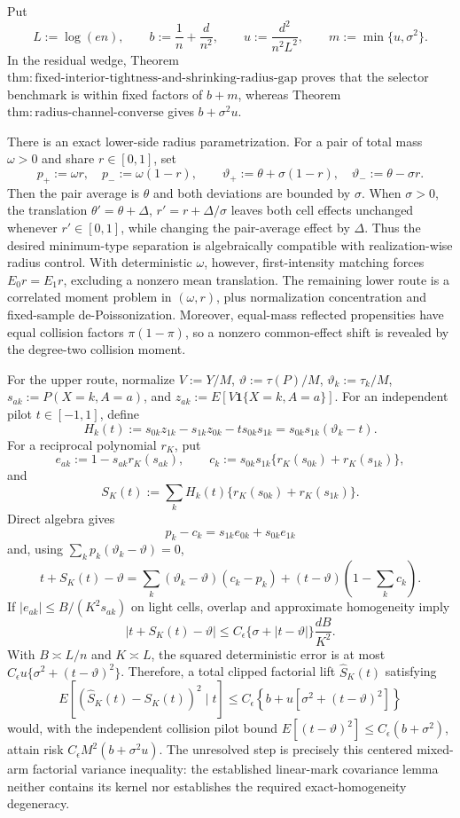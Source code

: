 Put
\[
 L:=\log(en),\qquad b:=\frac1n+\frac d{n^2},\qquad
 u:=\frac{d^2}{n^2L^2},\qquad m:=\min\{u,\sigma^2\}.
\]
In the residual wedge, Theorem~\(\mathrm{thm:fixed\text{-}interior\text{-}tightness\text{-}and\text{-}shrinking\text{-}radius\text{-}gap}\) proves that the selector benchmark is within fixed factors of \(b+m\), whereas Theorem~\(\mathrm{thm:radius\text{-}channel\text{-}converse}\) gives \(b+\sigma^2u\).

There is an exact lower-side radius parametrization.  For a pair of total mass \(\omega>0\) and share \(r\in[0,1]\), set
\[
 p_+:=\omega r,\quad p_-:=\omega(1-r),\qquad
 \vartheta_+:=\theta+\sigma(1-r),\quad
 \vartheta_-:=\theta-\sigma r.
\]
Then the pair average is \(\theta\) and both deviations are bounded by \(\sigma\).  When \(\sigma>0\), the translation \(\theta'=\theta+\Delta\), \(r'=r+\Delta/\sigma\) leaves both cell effects unchanged whenever \(r'\in[0,1]\), while changing the pair-average effect by \(\Delta\).  Thus the desired minimum-type separation is algebraically compatible with realization-wise radius control.  With deterministic \(\omega\), however, first-intensity matching forces \(E_0r=E_1r\), excluding a nonzero mean translation.  The remaining lower route is a correlated moment problem in \((\omega,r)\), plus normalization concentration and fixed-sample de-Poissonization.  Moreover, equal-mass reflected propensities have equal collision factors \(\pi(1-\pi)\), so a nonzero common-effect shift is revealed by the degree-two collision moment.

For the upper route, normalize \(V:=Y/M\), \(\vartheta:=\tau(P)/M\), \(\vartheta_k:=\tau_k/M\), \(s_{ak}:=P(X=k,A=a)\), and \(z_{ak}:=E[V\mathbf1\{X=k,A=a\}]\).  For an independent pilot \(t\in[-1,1]\), define
\[
 H_k(t):=s_{0k}z_{1k}-s_{1k}z_{0k}-ts_{0k}s_{1k}
 =s_{0k}s_{1k}(\vartheta_k-t).
\]
For a reciprocal polynomial \(r_K\), put
\[
 e_{ak}:=1-s_{ak}r_K(s_{ak}),\qquad
 c_k:=s_{0k}s_{1k}\{r_K(s_{0k})+r_K(s_{1k})\},
\]
and
\[
 S_K(t):=\sum_kH_k(t)\{r_K(s_{0k})+r_K(s_{1k})\}.
\]
Direct algebra gives
\[
 p_k-c_k=s_{1k}e_{0k}+s_{0k}e_{1k}
\]
and, using \(\sum_kp_k(\vartheta_k-\vartheta)=0\),
\[
 t+S_K(t)-\vartheta
 =\sum_k(\vartheta_k-\vartheta)(c_k-p_k)
 +(t-\vartheta)\left(1-\sum_kc_k\right).
\]
If \(|e_{ak}|\le B/(K^2s_{ak})\) on light cells, overlap and approximate homogeneity imply
\[
 |t+S_K(t)-\vartheta|
 \le C_\epsilon\{\sigma+|t-\vartheta|\}\frac{dB}{K^2}.
\]
With \(B\asymp L/n\) and \(K\asymp L\), the squared deterministic error is at most \(C_\epsilon u\{\sigma^2+(t-\vartheta)^2\}\).  Therefore, a total clipped factorial lift \(\widehat S_K(t)\) satisfying
\[
 E[(\widehat S_K(t)-S_K(t))^2\mid t]
 \le C_\epsilon\left\{b+u[\sigma^2+(t-\vartheta)^2]\right\}
\]
would, with the independent collision pilot bound \(E[(t-\vartheta)^2]\le C_\epsilon(b+\sigma^2)\), attain risk \(C_\epsilon M^2(b+\sigma^2u)\).  The unresolved step is precisely this centered mixed-arm factorial variance inequality: the established linear-mark covariance lemma neither contains its kernel nor establishes the required exact-homogeneity degeneracy.